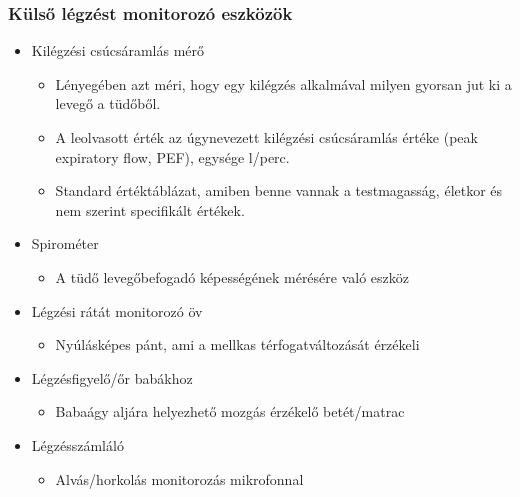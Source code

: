\subsubsection{Külső légzést monitorozó eszközök}
\begin{itemize}
    \item Kilégzési csúcsáramlás mérő
    \begin{itemize}
        \item Lényegében azt méri, hogy egy kilégzés alkalmával milyen gyorsan jut ki a levegő a tüdőből.
        \item A leolvasott érték az úgynevezett kilégzési csúcsáramlás értéke (peak expiratory flow, PEF), egysége l/perc.        
        \item Standard értéktáblázat, amiben benne vannak a testmagasság, életkor és nem szerint specifikált értékek.
    \end{itemize}
    \item Spirométer
    \begin{itemize}
        \item A tüdő levegőbefogadó képességének mérésére való eszköz
    \end{itemize}
    \item Légzési rátát monitorozó öv
    \begin{itemize}
        \item Nyúlásképes pánt, ami a mellkas térfogatváltozását érzékeli
    \end{itemize}
    \item Légzésfigyelő/őr babákhoz
    \begin{itemize}
        \item Babaágy aljára helyezhető mozgás érzékelő betét/matrac
    \end{itemize}
    \item Légzésszámláló
    \begin{itemize}
        \item Alvás/horkolás monitorozás mikrofonnal
    \end{itemize}
\end{itemize}

\clearpage
